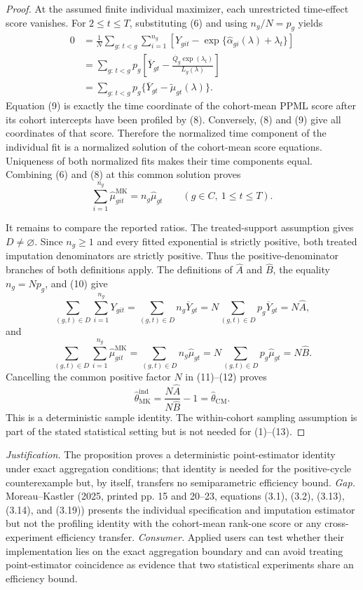 \documentclass{article}
\begin{document}
\begin{proof}
At the assumed finite individual maximizer, each unrestricted time-effect score vanishes.  For \(2\le t\le T\), substituting (6) and using \(n_g/N=p_g\) yields
\[
\begin{aligned}
0
&=\frac1N\sum_{g:\,t<g}\sum_{i=1}^{n_g}
\left[Y_{git}-
\exp\{\widehat\alpha_{gi}(\lambda)+\lambda_t\}\right]\\
&=\sum_{g:\,t<g}p_g
\left[\overline Y_{gt}-
\frac{\overline Q_g\exp(\lambda_t)}{L_g(\lambda)}\right]\\
&=\sum_{g:\,t<g}p_g
\{\overline Y_{gt}-\widetilde\mu_{gt}(\lambda)\}.
\end{aligned}
\tag{9}
\]
Equation (9) is exactly the time coordinate of the cohort-mean PPML score after its cohort intercepts have been profiled by (8).  Conversely, (8) and (9) give all coordinates of that score.  Therefore the normalized time component of the individual fit is a normalized solution of the cohort-mean score equations.  Uniqueness of both normalized fits makes their time components equal.  Combining (6) and (8) at this common solution proves
\[
\sum_{i=1}^{n_g}\widehat\mu^{\mathrm{MK}}_{git}
=n_g\widehat\mu_{gt}
\qquad(g\in C,\ 1\le t\le T).
\tag{10}
\]

It remains to compare the reported ratios.  The treated-support assumption gives \(D\ne\varnothing\).  Since \(n_g\ge1\) and every fitted exponential is strictly positive, both treated imputation denominators are strictly positive.  Thus the positive-denominator branches of both definitions apply.  The definitions of \(\widehat A\) and \(\widehat B\), the equality \(n_g=Np_g\), and (10) give
\[
\sum_{(g,t)\in D}\sum_{i=1}^{n_g}Y_{git}
=\sum_{(g,t)\in D}n_g\overline Y_{gt}
=N\sum_{(g,t)\in D}p_g\overline Y_{gt}
=N\widehat A,
\tag{11}
\]
and
\[
\sum_{(g,t)\in D}\sum_{i=1}^{n_g}
\widehat\mu^{\mathrm{MK}}_{git}
=\sum_{(g,t)\in D}n_g\widehat\mu_{gt}
=N\sum_{(g,t)\in D}p_g\widehat\mu_{gt}
=N\widehat B.
\tag{12}
\]
Cancelling the common positive factor \(N\) in (11)--(12) proves
\[
\widehat\theta_{\mathrm{MK}}^{\mathrm{ind}}
=\frac{N\widehat A}{N\widehat B}-1
=\widehat\theta_{\mathrm{CM}}.
\tag{13}
\]
This is a deterministic sample identity.  The within-cohort sampling assumption is part of the stated statistical setting but is not needed for (1)--(13).
\end{proof}
\par\smallskip\noindent \textit{Justification.} The proposition proves a deterministic point-estimator identity under exact aggregation conditions; that identity is needed for the positive-cycle counterexample but, by itself, transfers no semiparametric efficiency bound. \textit{Gap.} Moreau--Kastler (2025, printed pp. 15 and 20--23, equations (3.1), (3.2), (3.13), (3.14), and (3.19)) presents the individual specification and imputation estimator but not the profiling identity with the cohort-mean rank-one score or any cross-experiment efficiency transfer. \textit{Consumer.} Applied users can test whether their implementation lies on the exact aggregation boundary and can avoid treating point-estimator coincidence as evidence that two statistical experiments share an efficiency bound.
\end{document}
